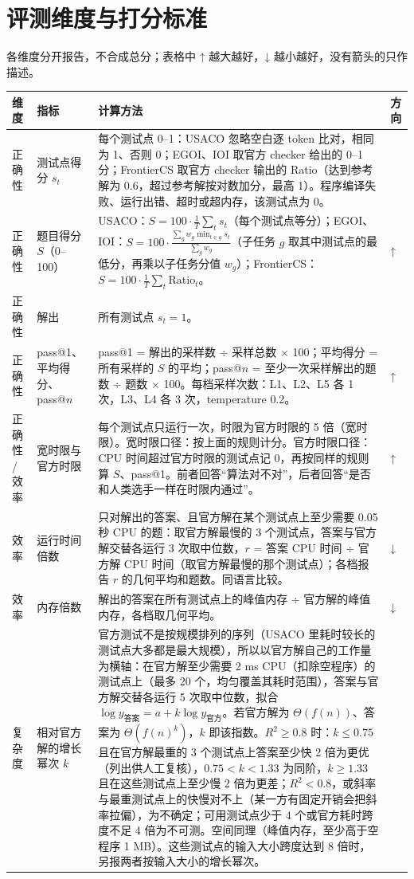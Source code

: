 \section{评测维度与打分标准}
各维度分开报告，不合成总分；表格中 ↑ 越大越好，↓ 越小越好，没有箭头的只作描述。
{\small\begin{longtable}{@{}p{1.6cm}p{2.6cm}p{10.3cm}p{0.9cm}@{}}
\toprule 维度 & 指标 & 计算方法 & 方向 \\ \midrule \endhead
正确性 & 测试点得分 $s_t$ & 每个测试点 0–1：USACO 忽略空白逐 token 比对，相同为 1、否则 0；EGOI、IOI 取官方 checker 给出的 0–1 分；FrontierCS 取官方 checker 输出的 Ratio（达到参考解为 0.6，超过参考解按对数加分，最高 1）。程序编译失败、运行出错、超时或超内存，该测试点为 0。 &  \\
正确性 & 题目得分 $S$（0–100） & USACO：$S = 100 \cdot \frac{1}{T}\sum_t s_t$（每个测试点等分）；EGOI、IOI：$S = 100 \cdot \frac{\sum_g w_g \min_{t \in g} s_t}{\sum_g w_g}$（子任务 $g$ 取其中测试点的最低分，再乘以子任务分值 $w_g$）；FrontierCS：$S = 100 \cdot \frac{1}{T}\sum_t \mathrm{Ratio}_t$。 & ↑ \\
正确性 & 解出 & 所有测试点 $s_t = 1$。 &  \\
正确性 & pass@1、平均得分、pass@$n$ & pass@1 = 解出的采样数 ÷ 采样总数 × 100；平均得分 = 所有采样的 $S$ 的平均；pass@$n$ = 至少一次采样解出的题数 ÷ 题数 × 100。每档采样次数：L1、L2、L5 各 1 次，L3、L4 各 3 次，temperature 0.2。 & ↑ \\
正确性 / 效率 & 宽时限与官方时限 & 每个测试点只运行一次，时限为官方时限的 5 倍（宽时限）。宽时限口径：按上面的规则计分。官方时限口径：CPU 时间超过官方时限的测试点记 0，再按同样的规则算 $S$、pass@1。前者回答“算法对不对”，后者回答“是否和人类选手一样在时限内通过”。 & ↑ \\
效率 & 运行时间倍数 & 只对解出的答案、且官方解在某个测试点上至少需要 0.05 秒 CPU 的题：取官方解最慢的 3 个测试点，答案与官方解交替各运行 3 次取中位数，$r$ = 答案 CPU 时间 ÷ 官方解 CPU 时间（取官方解最慢的那个测试点）；各档报告 $r$ 的几何平均和题数。同语言比较。 & ↓ \\
效率 & 内存倍数 & 解出的答案在所有测试点上的峰值内存 ÷ 官方解的峰值内存，各档取几何平均。 & ↓ \\
复杂度 & 相对官方解的增长幂次 $k$ & 官方测试不是按规模排列的序列（USACO 里耗时较长的测试点大多都是最大规模），所以以官方解自己的工作量为横轴：在官方解至少需要 2 ms CPU（扣除空程序）的测试点上（最多 20 个，均匀覆盖其耗时范围），答案与官方解交替各运行 5 次取中位数，拟合 $\log y_{\text{答案}} = a + k \log y_{\text{官方}}$。若官方解为 $\Theta(f(n))$、答案为 $\Theta(f(n)^k)$，$k$ 即该指数。$R^2 \ge 0.8$ 时：$k \le 0.75$ 且在官方解最重的 3 个测试点上答案至少快 2 倍为更优（列出供人工复核），$0.75 < k < 1.33$ 为同阶，$k \ge 1.33$ 且在这些测试点上至少慢 2 倍为更差；$R^2 < 0.8$，或斜率与最重测试点上的快慢对不上（某一方有固定开销会把斜率拉偏），为不确定；可用测试点少于 4 个或官方耗时跨度不足 4 倍为不可测。空间同理（峰值内存，至少高于空程序 1 MB）。这些测试点的输入大小跨度达到 8 倍时，另报两者按输入大小的增长幂次。 &  \\

\end{longtable}}
